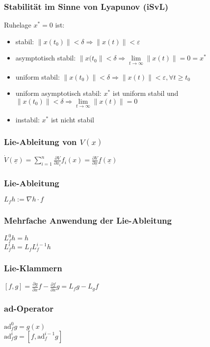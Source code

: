 \documentclass[6pt,a4paper,fleqn]{scrartcl}
\begin{document}
\begin{multicols*}{4}
\subsubsection*{Stabilität im Sinne von Lyapunov (iSvL)}
Ruhelage $x^* = 0$ ist:
\begin{itemize}
  \item stabil: $\|x(t_0)\| < \delta \Rightarrow \|x(t)\| < \varepsilon$
  \item asymptotisch stabil: $\|x(t_0\| < \delta \Rightarrow \lim\limits_{t \rightarrow \infty} \|x(t)\| = 0 = x^*$
  \item uniform stabil: $\|x(t_0)\| < \delta \Rightarrow \|x(t)\| < \varepsilon, \forall t \geq t_0$
  \item uniform asymptotisch stabil: $x^*$ ist uniform stabil und \\ $\|x(t_0)\| < \delta \Rightarrow \lim\limits_{t \rightarrow \infty} \|x(t)\| = 0$
  \item instabil: $x^*$ ist nicht stabil
\end{itemize}

\subsubsection*{Lie-Ableitung von $V(x)$}
$\dot{V}(\underline{x}) = \sum\limits_{i=1}^{n} \frac{\partial V}{\partial x_i}f_i(x) = \frac{\partial V}{\partial \underline{x}} \underline{f}(\underline{x}) $

\subsubsection*{Lie-Ableitung}
$L_f h := \nabla h \cdot f$

\subsubsection*{Mehrfache Anwendung der Lie-Ableitung}
$L_f^0 h = h$ \\
$L_f^i h = L_f L_f^{i-1} h$

\subsubsection*{Lie-Klammern}
$\left[ f,g \right] = \frac{\partial g}{\partial x} f - \frac{\partial f}{\partial x} g = L_f g - L_g f$

\subsubsection*{ad-Operator}
$\text{ad}_f^0 g = g(x)$ \\
$\text{ad}_f^i g = \left[ f, \text{ad}_f^{i-1} g \right]$


\end{multicols*}
\end{document}
